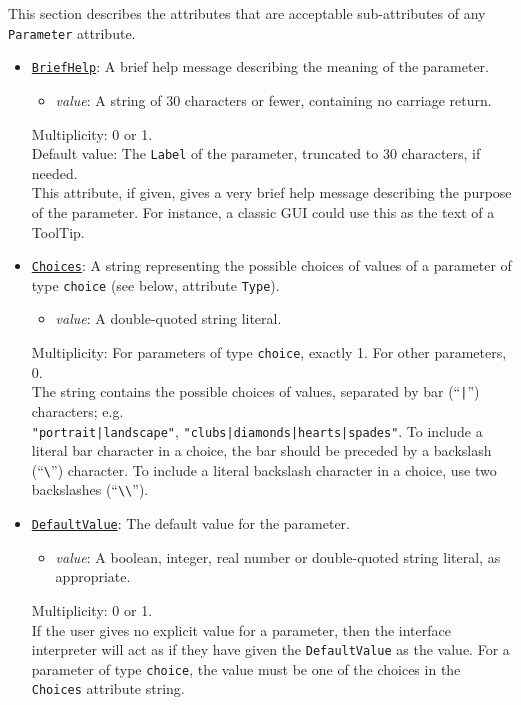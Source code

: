 \documentclass[11pt]{article}
\begin{document}
This section describes the attributes that are acceptable
sub-attributes of any {\tt Parameter} attribute.

\begin{itemize}

\item \underline{\tt BriefHelp}:  A brief help message describing
the meaning of the parameter.
\begin{itemize}
\item {\it value}: A string of 30 characters or fewer, containing
  no carriage return.
\end{itemize}
Multiplicity: 0 or 1. \\
Default value: The {\tt Label} of the parameter, truncated to 30
characters, if needed. \\
This attribute, if given, gives a very brief help message
describing the purpose of the parameter.  For instance, a classic
GUI could use this as the text of a ToolTip.

\item \underline{\tt Choices}:  A string representing the possible
choices of values of a parameter of type {\tt choice} (see below,
attribute {\tt Type}).
\begin{itemize}
\item {\it value}:  A double-quoted string literal.
\end{itemize}
Multiplicity:  For parameters of type {\tt choice}, exactly 1.
For other parameters, 0. \\
The string contains the possible choices of values, separated
by bar (``\verb/|/'') characters; e.g. \\
\verb/"portrait|landscape"/,
\verb/"clubs|diamonds|hearts|spades"/.
To include a literal bar character in a choice, the bar should
be preceded by a backslash (``\verb/\/'') character.
To include a literal backslash character in a choice,
use two backslashes (``\verb/\\/'').

\item \underline{\tt DefaultValue}:  The default value for the parameter.
\begin{itemize}
\item {\it value}:  A boolean, integer, real number or double-quoted
  string literal, as appropriate.
\end{itemize}
Multiplicity: 0 or 1. \\
If the user gives no explicit value for a parameter, then the interface
interpreter will act as if they have given the {\tt DefaultValue} as the
value.  For a parameter of type {\tt choice}, the value must be one
of the choices in the {\tt Choices} attribute string.


\end{itemize}
\end{document}
